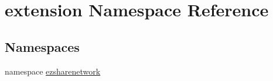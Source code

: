 \hypertarget{namespaceextension}{\section{extension Namespace Reference}
\label{namespaceextension}
}
\subsection*{Namespaces}
\begin{DoxyCompactItemize}
\item 
namespace \hyperlink{namespaceextension_1_1ezsharenetwork}{ezsharenetwork}
\end{DoxyCompactItemize}
